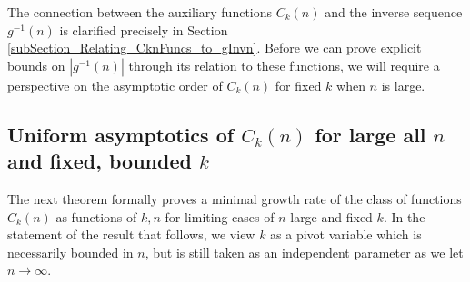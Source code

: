 \documentclass[11pt,reqno,a4letter]{article}
\numberwithin{figure}{section}
\numberwithin{table}{section}
\theoremstyle{plain}
\numberwithin{theorem}{section}
\theoremstyle{definition}
\begin{document}
The connection between the auxiliary functions $C_k(n)$ and the inverse sequence $g^{-1}(n)$ is 
clarified precisely in Section \ref{subSection_Relating_CknFuncs_to_gInvn}. Before we can prove explicit 
bounds on $|g^{-1}(n)|$ through its relation to these functions, we will require a perspective 
on the asymptotic order of $C_k(n)$ for fixed $k$ when $n$ is large. 

\subsection{Uniform asymptotics of $C_k(n)$ for large all $n$ and fixed, bounded $k$} 

The next theorem formally proves a minimal growth rate of the class of functions 
$C_k(n)$ as functions of $k,n$ for limiting cases of $n$ large and fixed $k$. 
In the statement of the result that follows, we view $k$ as a pivot variable which is 
necessarily bounded in $n$, but is still taken as an independent parameter as 
we let $n \rightarrow \infty$. 
\end{document}
